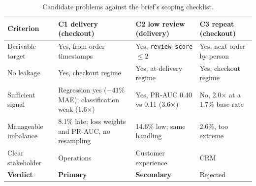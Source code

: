 \documentclass[11pt,a4paper]{article}
\newcommand{\code}[1]{\texttt{\small #1}}
\begin{document}
\begin{table}[htbp]
\centering
\caption{Candidate problems against the brief's scoping checklist.}
\label{tab:checklist}
\small
\begin{tabular}{@{}p{2.5cm}p{4.1cm}p{3.6cm}p{3.5cm}@{}}
\toprule
\textbf{Criterion} & \textbf{C1 delivery (checkout)} & \textbf{C2 low review (delivery)} & \textbf{C3 repeat (checkout)} \\
\midrule
Derivable target & Yes, from order timestamps & Yes, \code{review\_score} $\le 2$ & Yes, next order by person \\
No leakage & Yes, checkout regime & Yes, at-delivery regime & Yes, checkout regime \\
Sufficient signal & Regression yes ($-41\%$ MAE); classification weak (1.6$\times$) & Yes, PR-AUC 0.40 vs 0.11 (3.6$\times$) & No, 2.0$\times$ at a 1.7\% base rate \\
Manageable imbalance & 8.1\% late; loss weights and PR-AUC, no resampling & 14.6\% low; same handling & 2.6\%, too extreme \\
Clear stakeholder & Operations & Customer experience & CRM \\
\midrule
\textbf{Verdict} & \textbf{Primary} & \textbf{Secondary} & Rejected \\
\bottomrule
\end{tabular}
\end{table}
\end{document}
